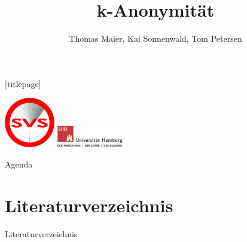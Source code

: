 \documentclass[t]{beamer}
\title{k-Anonymität}
\author[]{Thomas Maier, Kai Sonnenwald, Tom Petersen}
\institute[Uni Hamburg]{Universität Hamburg\\ Fachbereich Informatik}
\date{}
\begin{document}
\begingroup
	[titlepage]
	\begin{frame}[plain]
		\vskip8mm
		\includegraphics[width=2.2cm]{pic/svs_logo_hires-ohne-was.png}
		\titlepage
		\vspace{\fill}
		\includegraphics[width=2.9cm]{pic/UHH-Logo_2010_Farbe_RGB_hires_nomargin.png}
		\vskip20pt
	\end{frame}
\endgroup

\begin{frame}{Agenda}
	\tableofcontents
\end{frame}









\section{Literaturverzeichnis}

\begin{frame}[allowframebreaks]{Literaturverzeichnis}
\nocite{*}


\end{frame}
\end{document}
